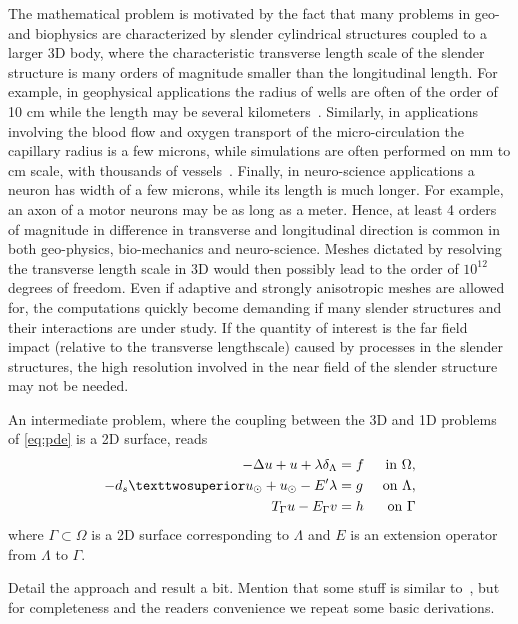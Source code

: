 \documentclass[r]{siamart171218}
\newcommand{\kent}[1]{{\color{blue}#1}}
\begin{document}
The mathematical problem is motivated by the fact that many problems in geo- and biophysics are characterized by slender cylindrical structures coupled to a larger 3D body, where the characteristic transverse length scale of the slender structure is many orders of magnitude smaller than the longitudinal length.  For example, in geophysical applications the radius of wells are often of the order of 10 cm while the length may be several kilometers~\cite{gjerde2019singularity}. Similarly, in applications involving the blood flow and oxygen transport of the micro-circulation the capillary radius is a few microns, while simulations are often performed on mm to cm scale, with thousands of vessels~\cite{berg2020modelling,fang2008oxygen,gould2017capillary}. Finally, in neuro-science applications a neuron has width of a few microns, while  its length is much longer. For example, an axon of a motor neurons may be as long as a meter.  Hence,  at least 4 orders of magnitude in difference in transverse and longitudinal direction is common in both geo-physics, bio-mechanics and neuro-science. Meshes dictated by resolving the transverse length scale in 3D would then possibly lead to the order of $10^{12}$ degrees of freedom. Even if adaptive and strongly anisotropic meshes are allowed for, the computations quickly become demanding if many slender structures and their interactions are under study.  If the quantity of interest is the far field impact (relative to the transverse lengthscale) caused by processes in the slender structures, the high resolution involved in the near field of the slender structure may not be needed.  

An intermediate problem, where the coupling between the 3D and 1D problems of \eqref{eq:pde} is a 2D surface, reads 
\begin{subequations}
\label{inteq:pde}
\begin{align}
\label{inteq:pde1}
  -\Delta u + u + \lambda \delta_{\Lambda} &= f &\mbox{ in } \Omega,\\
\label{inteq:pde2}
-d_s² \ud + \ud - E' \lambda  &= g &\mbox{ on } \Lambda,\\
\label{inteq:coupling}
T_\Gamma u - E_\Gamma v  &=  h &\mbox{ on } \Gamma
\end{align}
\end{subequations}
where $\Gamma \subset \Omega$ is a 2D surface corresponding to $\Lambda$
and $E$ is an extension operator from $\Lambda$ to $\Gamma$. 



\kent{
Detail the approach and result a bit.
Mention that some stuff is 
similar to~\cite{laurino_m2an}, but for completeness and the readers convenience we repeat some basic derivations. 
}
\end{document}
